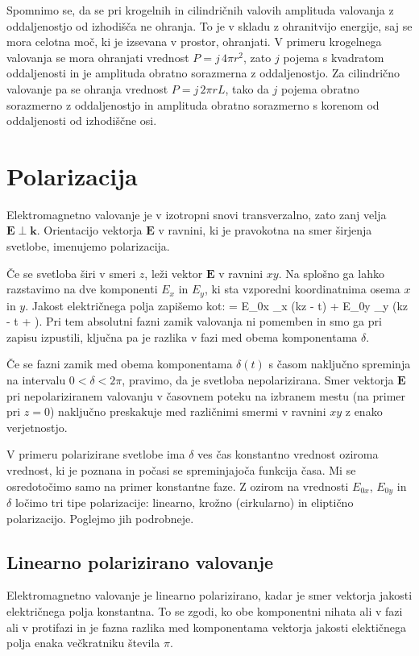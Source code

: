 \begin{remark}
Spomnimo se, da se pri krogelnih in cilindričnih valovih amplituda valovanja
z oddaljenostjo od izhodišča ne ohranja. To je v skladu z ohranitvijo energije, saj 
se mora celotna moč, ki je izsevana v prostor, ohranjati. V primeru krogelnega
valovanja se mora ohranjati vrednost $P = j\,4 \pi r^2$, zato $j$ pojema s kvadratom
oddaljenosti in je amplituda obratno sorazmerna z oddaljenostjo. Za cilindrično
valovanje pa se ohranja vrednost $P = j\,2\pi r L$, tako da $j$ pojema obratno
sorazmerno z oddaljenostjo in amplituda obratno sorazmerno s korenom od oddaljenosti
od izhodiščne osi. 
\end{remark}

\section{Polarizacija}
Elektromagnetno valovanje je v izotropni snovi 
transverzalno, zato zanj velja $\mathbf{E} \perp \mathbf{k}$. Orientacijo 
vektorja $\mathbf{E}$ v ravnini, ki je pravokotna na smer
širjenja svetlobe, imenujemo polarizacija.

Če se svetloba širi v smeri $z$, leži vektor $\mathbf{E}$ v ravnini $xy$. 
Na splošno ga lahko razstavimo na dve komponenti $E_x$ in $E_y$, ki sta
vzporedni koordinatnima osema $x$ in $y$. Jakost električnega
polja zapišemo kot:
\beq
{} = E_{0x} _x \cos \left(kz - \omega t\right) + 
E_{0y} _y \cos \left(kz - \omega t + \delta\right)\!.
\label{eq:03_37}
\eeq
Pri tem absolutni fazni zamik valovanja ni pomemben in smo ga 
pri zapisu izpustili, ključna pa je razlika v fazi med obema 
komponentama $\delta$.

Če se fazni zamik med obema komponentama $\delta(t)$ s časom 
naključno spreminja na intervalu $0<\delta <2\pi$, pravimo, da je 
svetloba nepolarizirana. Smer vektorja $\mathbf{E}$ pri nepolariziranem
valovanju v časovnem 
poteku na izbranem mestu (na primer pri $z=0$) naključno preskakuje med
različnimi smermi v ravnini $xy$ z enako verjetnostjo.

V primeru polarizirane svetlobe ima $\delta$ ves čas konstantno 
vrednost oziroma vrednost, ki je poznana in počasi se spreminjajoča 
funkcija časa. Mi se osredotočimo samo na primer konstantne faze. 
Z ozirom na vrednosti $E_{0x}$, $E_{0y}$ in $\delta$ ločimo tri tipe
polarizacije: linearno, krožno (cirkularno) in eliptično polarizacijo. 
Poglejmo jih podrobneje.

\subsection*{Linearno polarizirano valovanje}
Elektromagnetno valovanje je linearno polarizirano, kadar je smer vektorja
jakosti električnega polja konstantna. To se zgodi, ko obe komponentni nihata
ali v fazi ali v protifazi in je fazna razlika med komponentama vektorja 
jakosti elektičnega polja enaka večkratniku števila $\pi$. 

